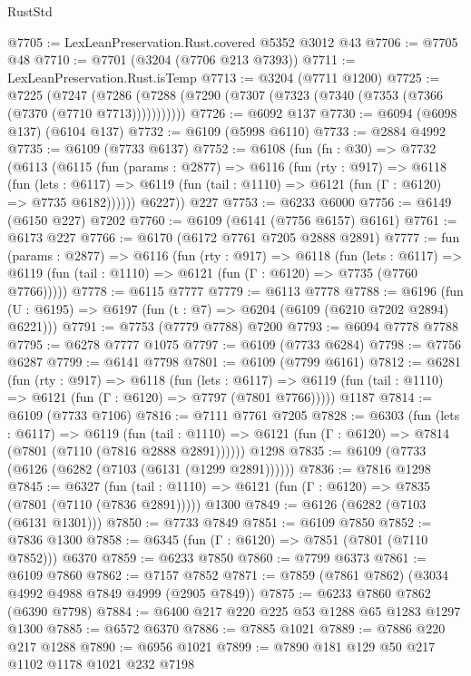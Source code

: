 \begin{lexlean}{RustStd}
\begin{coremodule}
@7705 := LexLeanPreservation.Rust.covered @5352 @3012 @43
@7706 := @7705 @48
@7710 := @7701 (@3204 (@7706 @213 @7393))
@7711 := LexLeanPreservation.Rust.isTemp
@7713 := @3204 (@7711 @1200)
@7725 := @7225
    (@7247 (@7286 (@7288 (@7290 (@7307 (@7323 (@7340 (@7353 (@7366 (@7370 (@7710 @7713)))))))))))
@7726 := @6092 @137
@7730 := @6094 (@6098 @137) (@6104 @137)
@7732 := @6109 (@5998 @6110)
@7733 := @2884 @4992
@7735 := @6109 (@7733 @6137)
@7752 := @6108
    (fun (fn : @30) =>
    @7732
      (@6113
        (@6115
          (fun (params : @2877) =>
          @6116
            (fun (rty : @917) =>
            @6118
              (fun (lets : @6117) =>
              @6119 (fun (tail : @1110) => @6121 (fun (Γ : @6120) => @7735 @6182))))))
        @6227))
    @227
@7753 := @6233 @6000
@7756 := @6149 (@6150 @227) @7202
@7760 := @6109 (@6141 (@7756 @6157) @6161)
@7761 := @6173 @227
@7766 := @6170 (@6172 @7761 @7205 @2888 @2891)
@7777 := fun (params : @2877) =>
  @6116
    (fun (rty : @917) =>
    @6118
      (fun (lets : @6117) =>
      @6119 (fun (tail : @1110) => @6121 (fun (Γ : @6120) => @7735 (@7760 @7766)))))
@7778 := @6115 @7777
@7779 := @6113 @7778
@7788 := @6196 (fun (U : @6195) => @6197 (fun (t : @7) => @6204 (@6109 (@6210 @7202 @2894) @6221)))
@7791 := @7753 (@7779 @7788) @7200
@7793 := @6094 @7778 @7788
@7795 := @6278 @7777 @1075
@7797 := @6109 (@7733 @6284)
@7798 := @7756 @6287
@7799 := @6141 @7798
@7801 := @6109 (@7799 @6161)
@7812 := @6281
    (fun (rty : @917) =>
    @6118
      (fun (lets : @6117) =>
      @6119 (fun (tail : @1110) => @6121 (fun (Γ : @6120) => @7797 (@7801 @7766)))))
    @1187
@7814 := @6109 (@7733 @7106)
@7816 := @7111 @7761 @7205
@7828 := @6303
    (fun (lets : @6117) =>
    @6119
      (fun (tail : @1110) => @6121 (fun (Γ : @6120) => @7814 (@7801 (@7110 (@7816 @2888 @2891))))))
    @1298
@7835 := @6109 (@7733 (@6126 (@6282 (@7103 (@6131 (@1299 @2891))))))
@7836 := @7816 @1298
@7845 := @6327
    (fun (tail : @1110) => @6121 (fun (Γ : @6120) => @7835 (@7801 (@7110 (@7836 @2891)))))
    @1300
@7849 := @6126 (@6282 (@7103 (@6131 @1301)))
@7850 := @7733 @7849
@7851 := @6109 @7850
@7852 := @7836 @1300
@7858 := @6345 (fun (Γ : @6120) => @7851 (@7801 (@7110 @7852))) @6370
@7859 := @6233 @7850
@7860 := @7799 @6373
@7861 := @6109 @7860
@7862 := @7157 @7852
@7871 := @7859 (@7861 @7862) (@3034 @4992 @4988 @7849 @4999 (@2905 @7849))
@7875 := @6233 @7860 @7862 (@6390 @7798)
@7884 := @6400 @217 @220 @225 @53 @1288 @65 @1283 @1297 @1300
@7885 := @6572 @6370
@7886 := @7885 @1021
@7889 := @7886 @220 @217 @1288
@7890 := @6956 @1021
@7899 := @7890 @181 @129 @50 @217 @1102 @1178 @1021 @232 @7198

\end{coremodule}
\end{lexlean}
